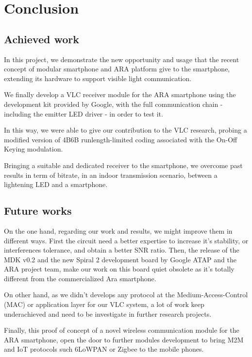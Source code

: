 
\chapter{Conclusion}

\label{Conclusion}



\section{Achieved work}

In this project, we demonstrate the new opportunity and usage that the recent concept of modular smartphone and ARA platform give to the smartphone, extending its hardware to support visible light communication.

We finally develop a VLC receiver module for the ARA smartphone using the development kit provided by Google, with the full communication chain - including the emitter LED driver - in order to test it.

In this way, we were able to give our contribution to the VLC research, probing a modified version of 4B6B runlength-limited coding associated with the On-Off Keying modulation.

Bringing a suitable and dedicated receiver to the smartphone, we overcome past results in term of bitrate, in an indoor transmission scenario, between a lightening LED and a smartphone.



\section{Future works}

On the one hand, regarding our work and results, we might improve them in different ways. First the circuit need a better expertise to increase it's stability, or interferences tolerance, and obtain a better SNR ratio.
Then, the release of the MDK v0.2 and the new Spiral 2 development board by Google ATAP and the ARA project team, make our work on this board quiet obsolete as it's totally different from the commercialized Ara smartphone.

On other hand, as we didn't develops any protocol at the Medium-Access-Control (MAC) or application layer for our VLC system, a lot of work keep underachieved and need to be investigate in further research projects.

Finally, this proof of concept of a novel wireless communication module for the ARA smartphone, open the door to further modules development to bring  M2M and IoT protocols such 6LoWPAN or Zigbee to the mobile phones.
